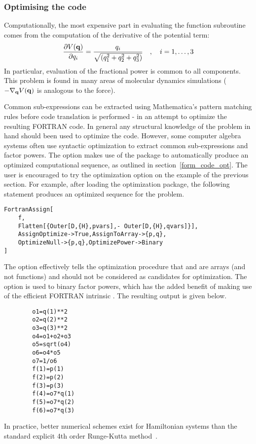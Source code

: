 \documentclass [12pt,twoside]{article}
\begin{document}
\pagebreak[2]

\subsubsection{Optimising the code}\label{form_rk_opt}
Computationally, the most expensive part in evaluating the function
subroutine comes from the computation of the derivative of the potential
term: 
$${{\partial V({\bf q})} \over {\partial q_i}} = {q_i \over
\sqrt{(q_1^2+q_2^2+q_3^2)}} \quad,\quad i=1,\ldots,3$$
In particular, evaluation of the fractional power is common to all
components. This problem is found in many areas of molecular dynamics
simulations ($-\nabla_{\bf q} V({\bf q})$ is analogous to the
force).

Common sub-expressions can be extracted using Mathematica's pattern matching rules
before code translation is performed - in an attempt to optimize the resulting
FORTRAN code. In general any structural knowledge of the problem in hand should
been used to optimize the code. However, some computer algebra systems often use
syntactic optimization to extract common sub-expressions and factor powers. The
option
 makes use of the package  to automatically
produce an optimized computational sequence, as outlined in
section~\ref{form_code_opt}. The user is encouraged to try the optimization
option on the example of the previous section. For example, after loading the
optimization package, the following statement produces an optimized sequence for
the problem.
\begin{verbatim}
FortranAssign[
    f, 
    Flatten[{Outer[D,{H},pvars],- Outer[D,{H},qvars]}],
    AssignOptimize->True,AssignToArray->{p,q},
    OptimizeNull->{p,q},OptimizePower->Binary
]
\end{verbatim}
The option  effectively tells the optimization procedure that
 and  are arrays (and not functions) and should not be considered
as candidates for optimization. The option  is used to
binary factor powers, which has the added benefit of making use of the efficient
FORTRAN intrinsic . The resulting output is given below.
\begin{verbatim}
        o1=q(1)**2
        o2=q(2)**2
        o3=q(3)**2
        o4=o1+o2+o3
        o5=sqrt(o4)
        o6=o4*o5
        o7=1/o6
        f(1)=p(1)
        f(2)=p(2)
        f(3)=p(3)
        f(4)=o7*q(1)
        f(5)=o7*q(2)
        f(6)=o7*q(3)
\end{verbatim}
In practice, better numerical schemes exist for Hamiltonian systems than
the standard explicit 4th order Runge-Kutta method~\cite{sanz-93a}.
\end{document}
